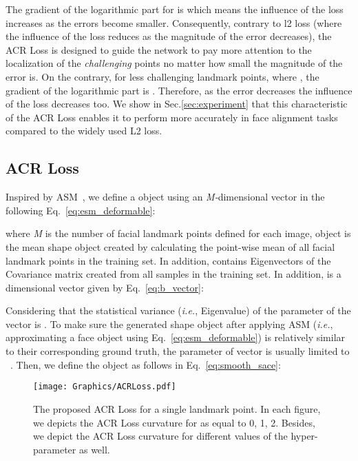 \documentclass[a4paper,conference]{IEEEtran}
\begin{document}
The gradient of the logarithmic part for  is  which means the influence of the loss increases as the errors become smaller. Consequently, contrary to l2 loss (where the influence of the loss reduces as the magnitude of the error decreases), the ACR Loss is designed to guide the network to pay more attention to the localization of the \textit{challenging} points no matter how small the magnitude of the error is. On the contrary, for less challenging landmark points, where , the gradient of the logarithmic part is . Therefore, as the error decreases the influence of the loss decreases too. We show in Sec.\ref{sec:experiment} that this characteristic of the ACR Loss enables it to perform more accurately in face alignment tasks compared to the widely used L2 loss. 


\subsection{ACR Loss} \label{sec:ACR_loss}
Inspired by ASM~\cite{cootes2004statistical}, we define a   object using an \textit{M-}dimensional vector in the following Eq.~\ref{eq:esm_deformable}:

where \textit{M} is the number of facial landmark points defined for each image,  object is the mean shape object created by calculating the point-wise mean of all facial landmark points in the training set. In addition,  contains  Eigenvectors of the Covariance matrix created from all samples in the training set. In addition,  is a  dimensional vector given by Eq.~\ref{eq:b_vector}:

Considering that the statistical variance (\textit{i.e.}, Eigenvalue) of the  parameter of the vector  is . To make sure the generated shape object after applying ASM (\textit{i.e.}, approximating a face object using Eq.~\ref{eq:esm_deformable}) is relatively similar to their corresponding ground truth, the parameter  of vector  is usually limited to ~\cite{cootes2000introduction}. Then, we define the  object as follows in Eq.~\ref{eq:smooth_sace}:



\begin{figure*}[t!]
 \centering
 \texttt{[image: Graphics/ACRLoss.pdf]}
 \caption{The proposed ACR Loss for a single landmark point. In each figure, we depicts the ACR Loss curvature for  as equal to 0, 1, 2. Besides, we depict the ACR Loss curvature for different values of the hyper-parameter  as well.}
  \label{fig:ACR_loss}
\end{figure*}
\end{document}
